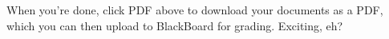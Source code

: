\documentclass[12pt]{article}
\begin{document}
When you're done, click PDF above to download your documents as a PDF, which you can then upload to BlackBoard for grading. Exciting, eh?


\end{document}
